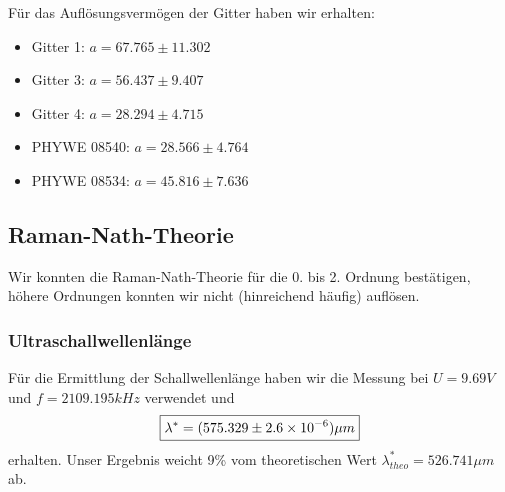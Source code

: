 Für das Auflösungsvermögen der Gitter haben wir erhalten:

\begin{itemize}
\item Gitter 1: $ a = 67.765 \pm 11.302 $
\item Gitter 3: $ a = 56.437 \pm 9.407 $
\item Gitter 4: $ a = 28.294 \pm 4.715 $
\item PHYWE 08540: $ a = 28.566 \pm 4.764 $
\item PHYWE 08534: $ a = 45.816 \pm 7.636 $
\end{itemize}


\subsection{Raman-Nath-Theorie}

Wir konnten die Raman-Nath-Theorie für die 0. bis 2. Ordnung bestätigen, höhere Ordnungen konnten wir nicht (hinreichend häufig) auflösen.

\subsubsection{Ultraschallwellenlänge}

Für die Ermittlung der Schallwellenlänge haben wir die Messung bei $ U = 9.69 V$ und $f = 2109.195 kHz $ verwendet und  
$$\boxed{ \lambda^* = (575.329 \pm 2.6\times 10^{-6}) \mu m}$$
erhalten. Unser Ergebnis weicht 9\% vom theoretischen Wert $ \lambda^*_{theo} = 526.741 \mu m$ ab.
